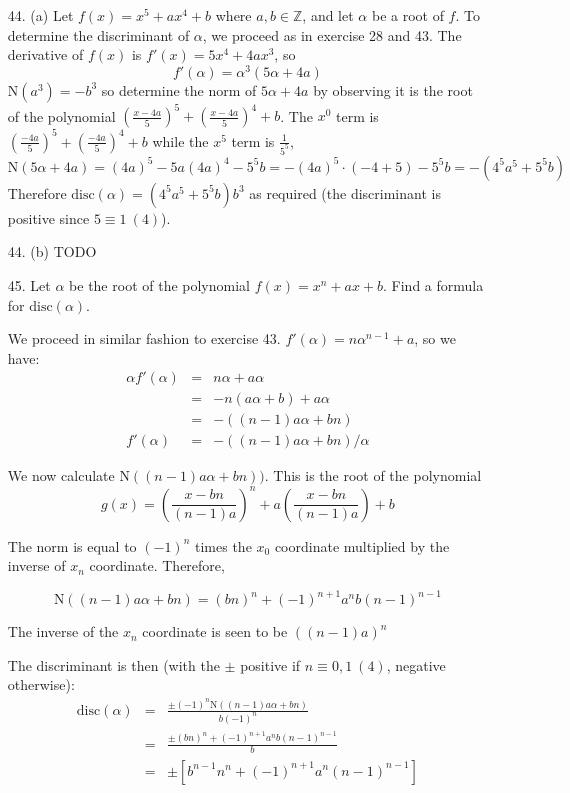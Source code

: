 \documentclass{article}
\newcommand{\Z}[0]{\mathbb{Z}}
\newcommand{\norm}[0]{\text{N}}
\newcommand{\disc}[1]{\text{disc}(#1)}
\begin{document}
\begin{enumerate}
\item[44. (a)] Let $f(x) = x^5 + ax^4 + b$ where $a, b \in \Z$, and let $\alpha$ be a root of $f$.  To determine the discriminant of $\alpha$, we proceed as in exercise 28 and 43.  The derivative of $f(x)$ is $f'(x) = 5x^4 + 4ax^3$, so  \[ f'(\alpha) = \alpha^3(5\alpha + 4a) \]  $\norm(a^3) = -b^3$ so determine the norm of $5\alpha + 4a$ by observing it is the root of the polynomial $(\frac{x - 4a}{5})^5 + (\frac{x - 4a}{5})^4 + b$.  The $x^0$ term is $(\frac{-4a}{5})^5 + (\frac{-4a}{5})^4 + b$ while the $x^5$ term is $\frac{1}{5^5}$, \[ \norm(5\alpha + 4a) = (4a)^5 - 5a (4a)^4 - 5^5 b = -(4a)^5 \cdot (-4 + 5) - 5^5 b = -(4^5 a^5 + 5^5 b) \]  Therefore $\disc{\alpha} = (4^5 a^5 + 5^5 b)b^3$ as required (the discriminant is positive since $5 \equiv 1\ (4)$).

\item[44. (b)] TODO

\item[45.] Let $\alpha$ be the root of the polynomial $f(x) = x^n + ax + b$.  Find a formula for $\disc{\alpha}$.

We proceed in similar fashion to exercise 43. $f'(\alpha) = n\alpha^{n-1} + a$, so we have:
\begin{eqnarray*}
    \alpha f'(\alpha) &=& n\alpha + a\alpha \\
                      &=& -n(a \alpha + b) + a\alpha \\
                      &=& -((n - 1)a \alpha + bn) \\
    f'(\alpha) &=& -((n - 1)a \alpha + bn) / \alpha
\end{eqnarray*}

We now calculate $\norm((n - 1)a \alpha + bn))$.  This is the root of the polynomial
\[ g(x) = \left(\frac{x - bn}{(n-1)a}\right)^n + a \left(\frac{x - bn}{(n-1)a}\right) + b\]

The norm is equal to $(-1)^n$ times the $x_0$ coordinate multiplied by the inverse of $x_n$ coordinate.  Therefore,

\[ \norm((n-1)a \alpha + bn) = (bn)^n + (-1)^{n + 1} a^n b (n -1)^{n-1} \]

The inverse of the $x_n$ coordinate is seen to be $((n - 1)a)^n$

The discriminant is then (with the $\pm$ positive if $n \equiv 0, 1\ (4)$, negative otherwise):
\begin{eqnarray*}
    \disc{\alpha} &=& \frac{\pm (-1)^n \norm((n - 1)a \alpha + bn)}{b(-1)^n}\\
    &=& \frac{\pm (bn)^n + (-1)^{n + 1} a^n b (n -1)^{n-1}}{b} \\
    &=& \pm [b^{n-1} n^n + (-1)^{n + 1} a^n (n -1)^{n-1}]
\end{eqnarray*}


\end{enumerate}
\end{document}
